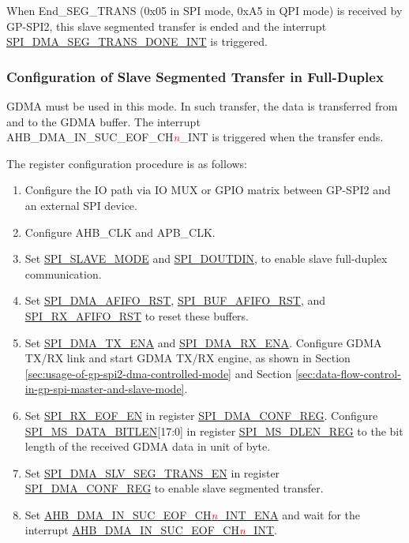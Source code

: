\documentclass[main\_\_EN.tex]{subfiles}
\begin{document}
When End\_SEG\_TRANS (0x05 in SPI mode, 0xA5 in QPI mode) is received by GP-SPI2, this slave segmented transfer is ended and the interrupt \hyperref[int:SPIDMASEGTRANSDONEINT]{ SPI\_DMA\_SEG\_TRANS\_DONE\_INT} is triggered.

\subsubsection{Configuration of Slave Segmented Transfer in Full-Duplex}\label{sec:gp-spi2-slave-fd-seg-trans}

GDMA must be used in this mode. In such transfer, the data is transferred from and to the GDMA buffer. The interrupt AHB\_DMA\_IN\_SUC\_EOF\_CH\textcolor{red}{\it{n}}\_INT is triggered when the transfer ends. 

The register configuration procedure is as follows:

\begin{enumerate}
   \item Configure the IO path via IO MUX or GPIO matrix between GP-SPI2 and an external SPI device. 
   \item Configure AHB\_CLK and APB\_CLK.
    \item Set \hyperref[fielddesc:SPISLAVEMODE]{SPI\_SLAVE\_MODE} and \hyperref[fielddesc:SPIDOUTDIN]{SPI\_DOUTDIN}, to enable slave full-duplex communication.
    \item Set \hyperref[fielddesc:SPIDMAAFIFORST]{SPI\_DMA\_AFIFO\_RST}, \hyperref[fielddesc:SPIBUFAFIFORST]{SPI\_BUF\_AFIFO\_RST}, and \hyperref[fielddesc:SPIRXAFIFORST]{SPI\_RX\_AFIFO\_RST} to reset these buffers.
    \item Set \hyperref[fielddesc:SPIDMATXENA]{SPI\_DMA\_TX\_ENA} and \hyperref[fielddesc:SPIDMARXENA]{SPI\_DMA\_RX\_ENA}. Configure GDMA TX/RX link and start GDMA TX/RX engine, as shown in Section \ref{sec:usage-of-gp-spi2-dma-controlled-mode} and Section \ref{sec:data-flow-control-in-gp-spi-master-and-slave-mode}.
    \item Set \hyperref[fielddesc:SPIRXEOFEN]{SPI\_RX\_EOF\_EN} in register \hyperref[regdesc:SPIDMACONFREG]{SPI\_DMA\_CONF\_REG}. Configure \hyperref[fielddesc:SPIMSDATABITLEN]{SPI\_MS\_DATA\_BITLEN}[17:0] in register \hyperref[regdesc:SPIMSDLENREG]{SPI\_MS\_DLEN\_REG} to the bit length of the received GDMA data in unit of byte.
    \item Set \hyperref[fielddesc:SPIDMASLVSEGTRANSEN]{SPI\_DMA\_SLV\_SEG\_TRANS\_EN} in register \hyperref[regdesc:SPIDMACONFREG]{SPI\_DMA\_CONF\_REG} to enable slave segmented transfer.
    \item Set \hyperref[fielddesc:AHBDMAINSUCEOFCHNINTENA]{AHB\_DMA\_IN\_SUC\_EOF\_CH\textcolor{red}{\it{n}}\_INT\_ENA} and wait for the interrupt \hyperref[int:GDMAINSUCEOFINT]{AHB\_DMA\_IN\_SUC\_EOF\_CH\textcolor{red}{\it{n}}\_INT}.
\end{enumerate}
\end{document}
